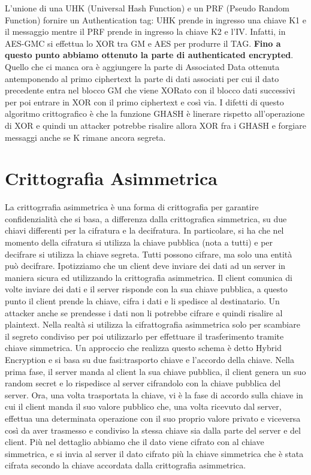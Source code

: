 \documentclass[a4paper,draft]{article}
\begin{document}
L'unione di una UHK (Universal Hash Function) e un PRF (Pseudo Random Function) fornire un Authentication tag: UHK prende in ingresso una chiave K1 e il messaggio mentre il PRF prende in ingresso la chiave K2 e l'IV\@.\newline
Infatti, in AES-GMC si effettua lo XOR tra GM e AES per produrre il TAG\@.\newline
\textbf{Fino a questo punto abbiamo ottenuto la parte di authenticated encrypted}.\newline
Quello che ci manca ora è aggiungere la parte di Associated Data ottenuta antemponendo al primo ciphertext la parte di dati associati per cui il dato precedente entra nel blocco GM che viene XORato con il blocco dati successivi per poi entrare in XOR con il primo ciphertext e così via\@.\newline
I difetti di questo algoritmo crittografico è che la funzione GHASH è linerare rispetto all'operazione di XOR e quindi un attacker potrebbe risalire allora XOR fra i GHASH e forgiare messaggi anche se K rimane ancora segreta\@.
\section{Crittografia Asimmetrica}
La crittogrrafia asimmetrica è una forma di crittografia per garantire confidenzialità che si basa, a differenza dalla crittografica simmetrica, su due chiavi differenti per la cifratura e la decifratura\@. In particolare, si ha che nel momento della cifratura si utilizza la chiave pubblica (nota a tutti) e per decifrare si utilizza la chiave segreta\@.\newline
Tutti possono cifrare, ma solo una entità può decifrare\@. Ipotizziamo che un client deve inviare dei dati ad un server in maniera sicura ed utilizzando la crittografia asimmetrica\@. Il client comunica di volte inviare dei dati e il server risponde con la sua chiave pubblica, a questo punto il client prende la chiave, cifra i dati e li spedisce al destinatario\@.
Un attacker anche se prendesse i dati non li potrebbe cifrare e quindi risalire al plaintext\@.\newline
Nella realtà si utilizza la cifrattografia asimmetrica solo per scambiare il segreto condiviso per poi utilizzarlo per effettuare il trasferimento tramite chiave simmetrica\@.
Un approccio che realizza questo schema è detto Hybrid Encryption e si basa su due fasi:\@il trasporto chiave e l'accordo della chiave\@. Nella prima fase, il server manda al client la sua chiave pubblica, il client genera un suo random secret e lo rispedisce al server cifrandolo con la chiave pubblica del server\@. Ora, una volta trasportata la chiave, vi è la fase di accordo sulla chiave in cui il client manda il suo valore pubblico che, una volta ricevuto dal server, effettua una determinata operazione con il suo proprio valore privato e viceversa così da aver trasmesso e condiviso la stessa chiave sia dalla parte del server e del client. Più nel dettaglio abbiamo che il dato viene cifrato con al chiave simmetrica, e si invia al server il dato cifrato più la chiave simmetrica che è stata cifrata secondo la chiave accordata dalla crittografia asimmetrica.
\end{document}
